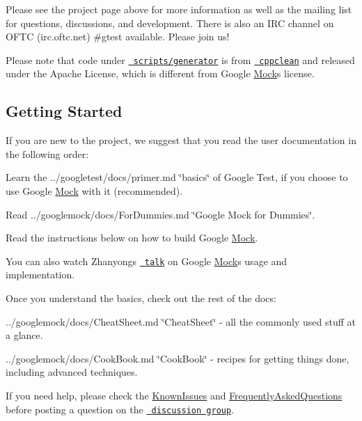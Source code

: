 Please see the project page above for more information as well as the mailing list for questions, discussions, and development. There is also an I\+RC channel on O\+F\+TC (irc.\+oftc.\+net) \#gtest available. Please join us!

Please note that code under \href{scripts/generator/}{\texttt{ scripts/generator}} is from \href{http://code.google.com/p/cppclean/}{\texttt{ cppclean}} and released under the Apache License, which is different from Google \mbox{\hyperlink{class_mock}{Mock}}\textquotesingle{}s license.

\subsection*{Getting Started}

If you are new to the project, we suggest that you read the user documentation in the following order\+:


\begin{DoxyItemize}
\item Learn the ../googletest/docs/primer.md \char`\"{}basics\char`\"{} of Google Test, if you choose to use Google \mbox{\hyperlink{class_mock}{Mock}} with it (recommended).
\item Read ../googlemock/docs/\+For\+Dummies.md \char`\"{}\+Google Mock for Dummies\char`\"{}.
\item Read the instructions below on how to build Google \mbox{\hyperlink{class_mock}{Mock}}.
\end{DoxyItemize}

You can also watch Zhanyong\textquotesingle{}s \href{http://www.youtube.com/watch?v=sYpCyLI47rM}{\texttt{ talk}} on Google \mbox{\hyperlink{class_mock}{Mock}}\textquotesingle{}s usage and implementation.

Once you understand the basics, check out the rest of the docs\+:


\begin{DoxyItemize}
\item ../googlemock/docs/\+Cheat\+Sheet.md \char`\"{}\+Cheat\+Sheet\char`\"{} -\/ all the commonly used stuff at a glance.
\item ../googlemock/docs/\+Cook\+Book.md \char`\"{}\+Cook\+Book\char`\"{} -\/ recipes for getting things done, including advanced techniques.
\end{DoxyItemize}

If you need help, please check the \mbox{\hyperlink{_obj__test_2lib_2googletest-release-1_88_81_2googlemock_2docs_2_known_issues_8md}{Known\+Issues}} and \mbox{\hyperlink{_obj__test_2lib_2googletest-release-1_88_81_2googlemock_2docs_2_frequently_asked_questions_8md}{Frequently\+Asked\+Questions}} before posting a question on the \href{http://groups.google.com/group/googlemock}{\texttt{ discussion group}}.

